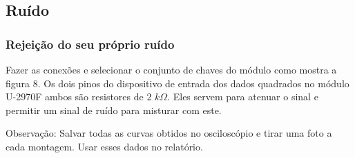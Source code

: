        \subsection{Ruído}
            \subsubsection{Rejeição do seu próprio ruído}
            Fazer as conexões e selecionar o conjunto de chaves do módulo como mostra a figura 8. Os dois pinos do dispositivo de entrada dos dados quadrados no módulo U-2970F ambos são resistores de 2 $k\Omega$. Eles servem para atenuar o sinal e permitir um sinal de ruído para misturar com este.
            
            Observação: Salvar todas as curvas obtidos no osciloscópio e tirar uma foto a cada montagem. Usar esses dados no relatório.
            
